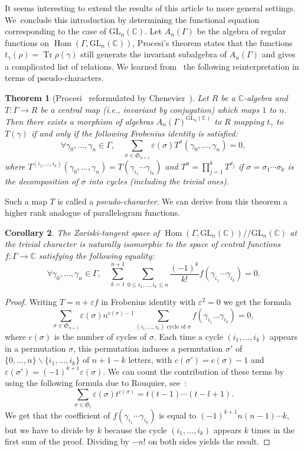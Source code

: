 \documentclass[11pt]{article}
\newcommand{\ie}{i.e.,\xspace}
\let\epsilon\varepsilon
\newtheorem{theorem}{Theorem}[section]
\newtheorem{corollary}[theorem]{Corollary}
\theoremstyle{definition}
\newcommand{\CC}{\mathbb{C}}
\newcommand{\tr}{\operatorname{Tr}}
\newcommand{\GL}{\mathrm{GL}}
\newcommand{\Hom}{\operatorname{Hom}}
\begin{document}
It seems interesting to extend the results of this article to more general
settings. We~conclude this introduction by determining the functional
equation corresponding to the case of
$\GL_n(\CC)$.
Let $A_n(\Gamma)$ be the algebra of regular functions on
$\Hom(\Gamma,\GL_n(\CC))$, Procesi's theorem states that the functions
$t_\gamma(\rho)=\tr \rho(\gamma)$ still generate the invariant subalgebra
of $A_n(\Gamma)$ and gives a complicated list of relations.
We learned from~\cite[Chap.\,2]{ChenevierHab} the following reinterpretation
in terms of pseudo-characters.
\begin{theorem}[Procesi~\cite{Procesi} reformulated by
Chenevier~\cite{ChenevierHab}]
Let $R$ be a $\CC$-algebra and $T:\Gamma\to R$ be a central map
(\ie invariant by conjugation) which maps $1$ to $n$.
Then there exists a morphism of algebras
$A_n(\Gamma)^{\GL_n(\CC)}$ to $R$ mapping $t_\gamma$ to $T(\gamma)$
if and only if the following Frobenius identity is satisfied:
\[\forall \gamma_0,\ldots,\gamma_{n}\in \Gamma, \quad
\sum_{\sigma\in \mathfrak{S}_{n+1}}\epsilon(\sigma)T^\sigma
(\gamma_0,\ldots,\gamma_n)=0, \]
where
$T^{(i_1,\ldots,i_k)}(\gamma_0,\ldots,\gamma_n)=
T(\gamma_{i_1}\cdots\gamma_{i_k})$
and $T^{\sigma}=\prod_{j=1}^k T^{\sigma_j}$ if
$\sigma=\sigma_1\cdots\sigma_k$ is the decomposition of $\sigma$ into
cycles (including the trivial ones).
\end{theorem}
Such a map $T$ is called a {\em pseudo-character}. We can derive from this
theorem a higher rank analogue of parallelogram functions.
\begin{corollary}
The Zariski-tangent space of
$\Hom(\Gamma,\GL_n(\CC))/\!/\GL_n(\CC)$ at the trivial character is naturally isomorphic to the space
of central functions $f\colon\Gamma\to\CC$ satisfying the following equality:
\begin{equation}\label{eq:Paraln}
\forall \gamma_0,\ldots,\gamma_n\in \Gamma,
\quad\sum_{k=1}^{n+1}\sum_{0\le i_1,\ldots,
i_k\le n}\frac{(-1)^{k}}{k!}f(\gamma_{i_1}\cdots\gamma_{i_k})=0.
\end{equation}
\end{corollary}
\begin{proof}
Writing $T=n+\epsilon f$ in Frobenius identity with $\epsilon^2=0$ we get
the formula
\[ \sum_{\sigma\in \mathfrak{S}_{n+1}}\epsilon(\sigma)n^{c(\sigma)-1}
\sum_{(i_1,\ldots,i_k)\text{ cycle of }\sigma}f(\gamma_{i_1}\ldots
\gamma_{i_k})=0, \]
where $c(\sigma)$ is the number of cycles of $\sigma$.
Each time a cycle $(i_1,\ldots,i_k)$ appears in a permutation $\sigma$,
this permutation induces a permutation $\sigma'$ of
$\{0,\ldots,n\}\smallsetminus\{i_1,\ldots,i_k\}$ of $n+1-k$ letters,
with $c(\sigma')=c(\sigma)-1$ and
$\epsilon(\sigma')=(-1)^{k+1}\epsilon(\sigma)$.
We can count the contribution of these terms by using the following
formula due to Rouquier, see~\cite[Cor.\,3.2]{Rouquier}:
\[ \sum_{\sigma\in \mathfrak{S}_l}\epsilon(\sigma)t^{c(\sigma)}=t(t-1)
\cdots(t-l+1). \]
We get that the coefficient of $f(\gamma_{i_1}\cdots\gamma_{i_k})$ is
equal to $(-1)^{k+1}n(n-1)\cdots k$, but we have to divide by $k$ because
the cycle $(i_1,\ldots,i_k)$ appears $k$ times in the first sum of the
proof. Dividing by $-n!$ on both sides yields the result.
\end{proof}
\end{document}
